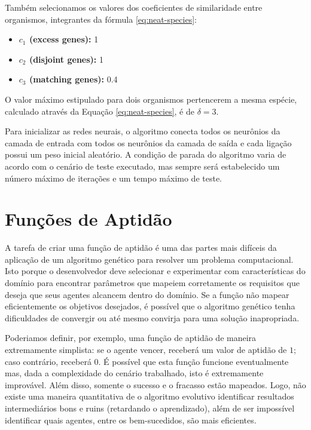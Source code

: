 Também selecionamos os valores dos coeficientes de similaridade entre
organismos, integrantes da fórmula \ref{eq:neat-species}:

\begin{itemize}
	\item \textbf{$c_1$ (excess genes):} 1
	\item \textbf{$c_2$ (disjoint genes):} 1
	\item \textbf{$c_3$ (matching genes):} 0.4
\end{itemize}

O valor máximo estipulado para dois organismos pertencerem a mesma espécie,
calculado através da Equação \ref{eq:neat-species}, é de $\delta = 3$.

Para inicializar as redes neurais, o algoritmo conecta todos os neurônios da
camada de entrada com todos os neurônios da camada de saída e cada ligação
possui um peso inicial aleatório. A condição de parada do algoritmo varia de
acordo com o cenário de teste executado, mas sempre será estabelecido um número
máximo de iterações e um tempo máximo de teste.


\section{\label{section:modelling-fitness}Funções de Aptidão}
A tarefa de criar uma função de aptidão é uma das partes mais difíceis da
aplicação de um algoritmo genético para resolver um problema computacional. Isto
porque o desenvolvedor deve selecionar e experimentar com características do
domínio para encontrar parâmetros que mapeiem corretamente os requisitos que
deseja que seus agentes alcancem dentro do domínio. Se a função não mapear
eficientemente os objetivos desejados, é possível que o algoritmo genético tenha
dificuldades de convergir ou até mesmo convirja para uma solução inapropriada.

Poderiamos definir, por exemplo, uma função de aptidão de maneira extremamente
simplista: se o agente vencer, receberá um valor de aptidão de $1$; caso
contrário, receberá $0$. É possível que esta função funcione eventualmente mas,
dada a complexidade do cenário trabalhado, isto é extremamente improvável. Além
disso, somente o sucesso e o fracasso estão mapeados. Logo, não existe uma
maneira quantitativa de o algoritmo evolutivo identificar resultados
intermediários bons e ruins (retardando o aprendizado), além de ser impossível
identificar quais agentes, entre os bem-sucedidos, são mais eficientes.

